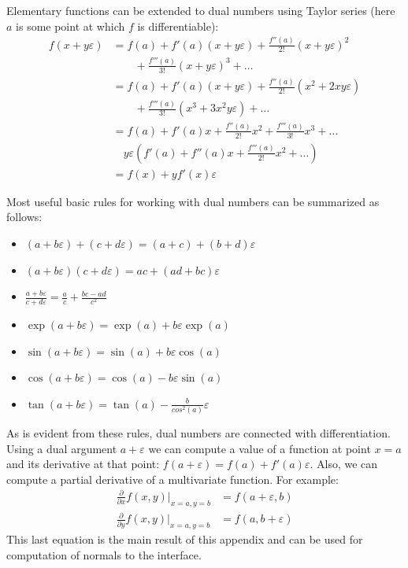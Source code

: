 \documentclass[preprint]{elsarticle}
\begin{document}
Elementary functions can be extended to dual numbers using Taylor series (here
$a$ is some point at which $f$ is differentiable):
\begin{equation}
  \begin{aligned}
    f(x + y\varepsilon) &= f(a) + f'(a)(x + y\varepsilon) + \frac{f''(a)}{2!}(x + y\varepsilon)^2 \\
    & \qquad + \frac{f'''(a)}{3!}(x + y\varepsilon)^3 + \dots \\
    &= f(a) + f'(a)(x + y\varepsilon) + \frac{f''(a)}{2!}(x^2 + 2xy\varepsilon) \\
    & \qquad + \frac{f'''(a)}{3!}(x^3 + 3x^2y\varepsilon) + \dots \\
    &= f(a) + f'(a)x + \frac{f''(a)}{2!}x^2 + \frac{f'''(a)}{3!}x^3 + \dots \\
    & \quad y\varepsilon(f'(a) + f''(a)x + \frac{f'''(a)}{2!}x^2 + \dots) \\
    &= f(x) + yf'(x)\varepsilon
  \end{aligned}
\end{equation}

Most useful basic rules for working with dual numbers can be summarized as follows:
\begin{itemize}
\item $(a + b\varepsilon) + (c + d\varepsilon) = (a + c) + (b + d)\varepsilon$
\item $(a + b\varepsilon) (c + d\varepsilon) = ac + (ad + bc)\varepsilon$
\item $\frac{a + b\varepsilon}{c + d\varepsilon} = \frac{a}{c} + \frac{bc - ad}{c^2}$
\item $\exp(a + b\varepsilon) = \exp(a) + b\varepsilon\exp(a)$
\item $\sin(a + b\varepsilon) = \sin(a) + b\varepsilon\cos(a)$
\item $\cos(a + b\varepsilon) = \cos(a) - b\varepsilon\sin(a)$
\item $\tan(a + b\varepsilon) = \tan(a) - \frac{b}{cos^2(a)}\varepsilon$
\end{itemize}

As is evident from these rules, dual numbers are connected with
differentiation. Using a dual argument $a + \varepsilon$ we can compute a value
of a function at point $x = a$ and its derivative at that point:
$f(a + \varepsilon) = f(a) + f'(a)\varepsilon$. Also, we can compute a partial
derivative of a multivariate function. For example:
\begin{equation}
  \begin{aligned}
    \frac{\partial}{\partial x} f(x, y) \vert_{x = a, y = b} &= f(a + \varepsilon,
    b) \\
    \frac{\partial}{\partial y} f(x, y) \vert_{x = a, y = b} &= f(a, b +
    \varepsilon)
  \end{aligned}
  \label{eq:autonormals}
\end{equation}
This last equation is the main result of this appendix and can be used for
computation of normals to the interface.


\end{document}
